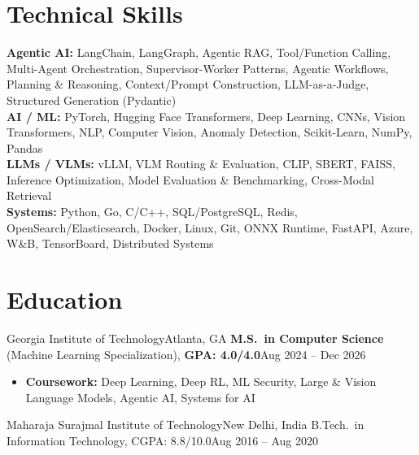 \documentclass[letterpaper,11pt]{article}
\begin{document}
\section{Technical Skills}
\footnotesize
\textbf{Agentic AI:} LangChain, LangGraph, Agentic RAG, Tool/Function Calling, Multi-Agent Orchestration,
  Supervisor-Worker Patterns, Agentic Workflows, Planning \& Reasoning, Context/Prompt Construction,
  LLM-as-a-Judge, Structured Generation (Pydantic) \\[1pt]
\textbf{AI / ML:} PyTorch, Hugging Face Transformers, Deep Learning, CNNs, Vision Transformers, NLP,
  Computer Vision, Anomaly Detection, Scikit-Learn, NumPy, Pandas \\[1pt]
\textbf{LLMs / VLMs:} vLLM, VLM Routing \& Evaluation, CLIP, SBERT, FAISS, Inference Optimization,
  Model Evaluation \& Benchmarking, Cross-Modal Retrieval \\[1pt]
\textbf{Systems:} Python, Go, C/C++, SQL/PostgreSQL, Redis, OpenSearch/Elasticsearch, Docker, Linux, Git,
  ONNX Runtime, FastAPI, Azure, W\&B, TensorBoard, Distributed Systems

\section{Education}
\resumeSubHeadingListStart
\resumeSubheading
{Georgia Institute of Technology}{Atlanta, GA}
{\textbf{M.S.\ in Computer Science} (Machine Learning Specialization), \textbf{GPA: 4.0/4.0}}{Aug 2024 -- Dec 2026}
\vspace{-3pt}
\begin{itemize}[leftmargin=0.20in, topsep=0pt, itemsep=0pt]
  \item\footnotesize{\textbf{Coursework:} Deep Learning, Deep RL, ML Security, Large \& Vision Language Models, Agentic AI, Systems for AI}
\end{itemize}
\resumeEducationCompact
{Maharaja Surajmal Institute of Technology}{New Delhi, India}
{B.Tech.\ in Information Technology, CGPA: 8.8/10.0}{Aug 2016 -- Aug 2020}
\resumeSubHeadingListEnd
\end{document}
